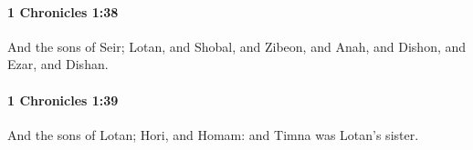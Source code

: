		\paragraph{1 Chronicles 1:38} %
			\label{1CHRONICLES-1-38}

			And the sons of Seir; Lotan, and Shobal, and Zibeon, and Anah, and Dishon, and Ezar, and Dishan.


		\paragraph{1 Chronicles 1:39} %
			\label{1CHRONICLES-1-39}

			And the sons of Lotan; Hori, and Homam: and Timna was Lotan’s sister.


